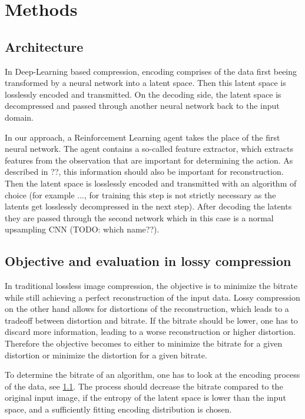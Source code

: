 \section{Methods}

\subsection{Architecture}\label{methods:Architecture}
    In Deep-Learning based compression, encoding comprises of the data first
    beeing transformed by a neural network into a latent space. Then this latent
    space is losslessly encoded and transmitted. On the decoding side, the
    latent space is decompressed and passed through another neural network back
    to the input domain.

    In our approach, a Reinforcement Learning agent takes the place of the first
    neural network. The agent contains a so-called feature extractor, which
    extracts features from the observation that are important for determining
    the action. As described in ??, this information should also be important
    for reconstruction. Then the latent space is losslessly encoded and
    transmitted with an algorithm of choice (for example ..., for training this
    step is not strictly necessary as the latents get losslessly decompressed in
    the next step). After decoding the latents they are passed through the
    second network which in this case is a normal upsampling CNN (TODO: which name??). 

\subsection{Objective and evaluation in lossy compression}
    In traditional lossless image compression, the objective is to minimize the
    bitrate while still achieving a perfect reconstruction of the input data.
    Lossy compression on the other hand allows for distortions of the
    reconstruction, which leads to a tradeoff between distortion and bitrate. If
    the bitrate should be lower, one has to discard more information, leading to
    a worse reconstruction or higher distortion. Therefore the objective becomes
    to either to minimize the bitrate for a given distortion or minimize the
    distortion for a given bitrate.

    To determine the bitrate of an algorithm, one has to look at the encoding
    process of the data, see \ref{methods:Architecture}. The process should
    decrease the bitrate compared to the original input image, if the entropy of
    the latent space is lower than the input space, and a sufficiently fitting
    encoding distribution is chosen.

